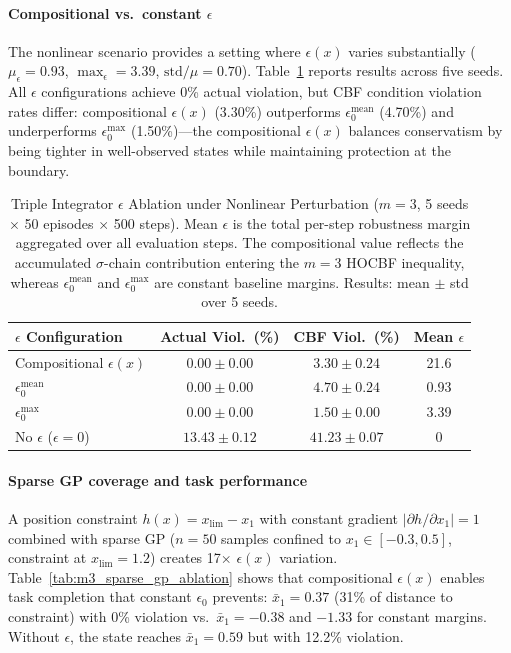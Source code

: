 \paragraph{Compositional vs.\ constant $\epsilon$} The nonlinear scenario provides a setting where $\epsilon(x)$ varies substantially ($\mu_\epsilon = 0.93$, $\max_\epsilon = 3.39$, $\mathrm{std}/\mu = 0.70$). Table~\ref{tab:m3_epsilon_ablation} reports results across five seeds. All $\epsilon$ configurations achieve 0\% actual violation, but CBF condition violation rates differ: compositional $\epsilon(x)$ (3.30\%) outperforms $\epsilon_0^{\mathrm{mean}}$ (4.70\%) and underperforms $\epsilon_0^{\mathrm{max}}$ (1.50\%)---the compositional $\epsilon(x)$ balances conservatism by being tighter in well-observed states while maintaining protection at the boundary.

\begin{table}[htbp]
    \centering
    \caption{Triple Integrator $\epsilon$ Ablation under Nonlinear Perturbation ($m = 3$, 5 seeds $\times$ 50 episodes $\times$ 500 steps). Mean $\epsilon$ is the total per-step robustness margin aggregated over all evaluation steps. The compositional value reflects the accumulated $\sigma$-chain contribution entering the $m=3$ HOCBF inequality, whereas $\epsilon_0^{\mathrm{mean}}$ and $\epsilon_0^{\mathrm{max}}$ are constant baseline margins. Results: mean $\pm$ std over 5 seeds.}
    \label{tab:m3_epsilon_ablation}
    \begin{tabular}{lccc}
        \toprule
        $\epsilon$ Configuration & Actual Viol.\ (\%) & CBF Viol.\ (\%) & Mean $\epsilon$ \\
        \midrule
        Compositional $\epsilon(x)$ & $0.00 \pm 0.00$ & $3.30 \pm 0.24$ & 21.6 \\
        $\epsilon_0^{\mathrm{mean}}$ & $0.00 \pm 0.00$ & $4.70 \pm 0.24$ & 0.93 \\
        $\epsilon_0^{\mathrm{max}}$ & $0.00 \pm 0.00$ & $1.50 \pm 0.00$ & 3.39 \\
        No $\epsilon$ ($\epsilon = 0$) & $13.43 \pm 0.12$ & $41.23 \pm 0.07$ & 0 \\
        \bottomrule
    \end{tabular}
\end{table}

\paragraph{Sparse GP coverage and task performance} A position constraint $h(x) = x_{\lim} - x_1$ with constant gradient $|\partial h / \partial x_1| = 1$ combined with sparse GP ($n = 50$ samples confined to $x_1 \in [-0.3, 0.5]$, constraint at $x_{\lim} = 1.2$) creates 17$\times$ $\epsilon(x)$ variation. Table~\ref{tab:m3_sparse_gp_ablation} shows that compositional $\epsilon(x)$ enables task completion that constant $\epsilon_0$ prevents: $\bar{x}_1 = 0.37$ (31\% of distance to constraint) with 0\% violation vs.\ $\bar{x}_1 = -0.38$ and $-1.33$ for constant margins. Without $\epsilon$, the state reaches $\bar{x}_1 = 0.59$ but with 12.2\% violation.

